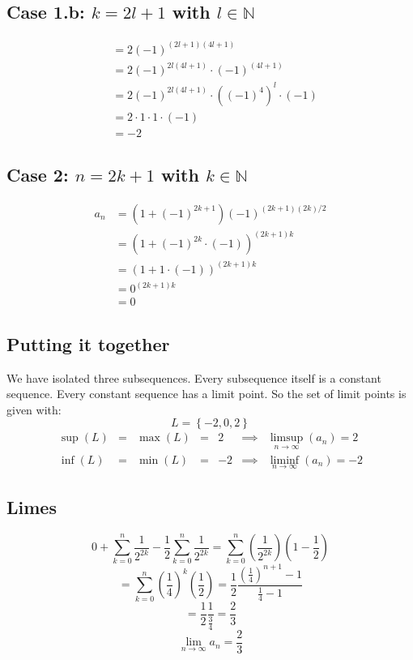 \documentclass[a4paper]{article}
\theoremstyle{definition}
\newcommand\set[1]{\left\{#1\right\}}
\begin{document}
\subsection{Case 1.b: $k = 2l + 1$ with $l \in \mathbb N$}
%
\begin{align*}
    &= 2 (-1)^{(2l + 1)(4l + 1)} \\
    &= 2 (-1)^{2l(4l + 1)} \cdot \left(-1\right)^{(4l + 1)} \\
    &= 2 (-1)^{2l(4l + 1)} \cdot \left((-1)^4\right)^l \cdot (-1) \\
    &= 2 \cdot 1 \cdot 1 \cdot (-1) \\
    &= -2
\end{align*}

\subsection{Case 2: $n = 2k + 1$ with $k \in \mathbb N$}
%
\begin{align*}
  a_n &= \left(1 + (-1)^{2k + 1}\right) (-1)^{(2k + 1)(2k)/2} \\
      &= \left(1 + (-1)^{2k} \cdot (-1)\right)^{(2k+1) k} \\
      &= \left(1 + 1\cdot(-1)\right)^{(2k + 1)k} \\
      &= 0^{(2k+1) k} \\
      &= 0
\end{align*}

\subsection{Putting it together}
%
We have isolated three subsequences. Every subsequence itself is a constant sequence.
Every constant sequence has a limit point. So the set of limit points is given with:
\[ L = \set{-2, 0, 2} \]
\[
  \begin{array}{rclcccccc}
    \sup(L) & = & \max(L) & = & 2  & \implies & \limsup_{n\to\infty}(a_n) = 2 \\
    \inf(L) & = & \min(L) & = & -2 & \implies & \liminf_{n\to\infty}(a_n) = -2
  \end{array}
\]

\subsection{Limes}
%
\[
  0 + \sum_{k=0}^n \frac{1}{2^{2k}} - \frac12 \sum_{k=0}^n \frac{1}{2^{2k}}
  = \sum_{k=0}^n \left(\frac{1}{2^{2k}}\right) \left(1 - \frac12\right)
\] \[
  = \sum_{k=0}^n \left(\frac14\right)^k \left(\frac12\right) = \frac12 \frac{\left(\frac14\right)^{n+1}-1}{\frac14 - 1}
\] \[
  = \frac12 \frac1{\frac34} = \frac23
\] \[
  \lim_{n\to\infty} a_n = \frac23
\]
\end{document}
